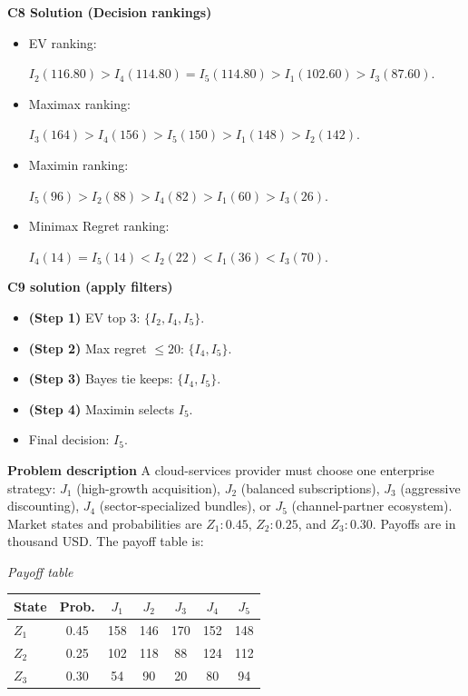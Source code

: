 \begin{ExamProblems}
		\textbf{C8 Solution (Decision rankings)}\par
		\begin{itemize}
			\item EV ranking: \par $I_2(116.80)>I_4(114.80)=I_5(114.80)>I_1(102.60)>I_3(87.60)$.
			\item Maximax ranking:\par $I_3(164)>I_4(156)>I_5(150)>I_1(148)>I_2(142)$.
			\item Maximin ranking: \par $I_5(96)>I_2(88)>I_4(82)>I_1(60)>I_3(26)$.
			\item Minimax Regret ranking:\par $I_4(14)=I_5(14)<I_2(22)<I_1(36)<I_3(70)$.
		\end{itemize}
		
		\textbf{C9 solution (apply filters)}\par
		\begin{itemize}
			\item \textbf{(Step 1)} EV top 3: $\{I_2,I_4,I_5\}$.
			\item \textbf{(Step 2)} Max regret $\leq 20$: $\{I_4,I_5\}$.
			\item \textbf{(Step 3)} Bayes tie keeps: $\{I_4,I_5\}$.
			\item \textbf{(Step 4)} Maximin selects $I_5$.
			\item Final decision: $I_5$.
		\end{itemize}
		
		\newpage
		\item
		\textbf{Problem description}
		A cloud-services provider must choose one enterprise strategy: $J_1$ (high-growth acquisition), $J_2$ (balanced subscriptions), $J_3$ (aggressive discounting), $J_4$ (sector-specialized bundles), or $J_5$ (channel-partner ecosystem).
		Market states and probabilities are $Z_1:0.45$, $Z_2:0.25$, and $Z_3:0.30$. Payoffs are in thousand USD. The payoff table is:
		
		\begin{center}
			\textit{Payoff table} \\
			\begin{tabular}{l c c c c c c}
				\hline
				State& Prob. & $J_1$ & $J_2$ & $J_3$ & $J_4$ & $J_5$ \\
				\hline
				$Z_1$ & 0.45 & 158 & 146 & 170 & 152 & 148 \\
				$Z_2$ & 0.25 & 102 & 118 & 88 & 124 & 112 \\
				$Z_3$ & 0.30 & 54 & 90 & 20 & 80 & 94 \\
				\hline
			\end{tabular}
		\end{center}
		

\end{ExamProblems}
